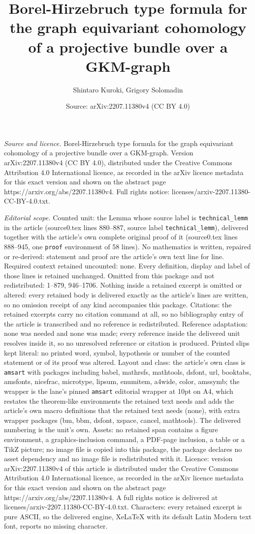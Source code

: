 \documentclass[10pt,a4paper]{amsart}
\title[Borel-Hirzebruch type formula for the graph equivariant coho]{Borel-Hirzebruch type formula for the graph equivariant cohomology of a projective bundle over a GKM-graph}
\author{Shintaro Kuroki, Grigory Solomadin}
\date{Source: arXiv:2207.11380v4 (CC BY 4.0)}
\begin{document}
\maketitle

\noindent\emph{Source and licence.} Borel-Hirzebruch type formula for the graph equivariant cohomology of a projective bundle over a GKM-graph. Version arXiv:2207.11380v4 (CC BY 4.0), distributed under the Creative Commons Attribution 4.0 International licence, as recorded in the arXiv licence metadata for this exact version and shown on the abstract page https://arxiv.org/abs/2207.11380v4. Full rights notice: licenses/arxiv-2207.11380-CC-BY-4.0.txt.\par\smallskip

\noindent\textit{Editorial scope.} Counted unit: the Lemma whose source label is \texttt{technical\_lemm} in the article (source0.tex lines 880--887, source label \texttt{technical\_lemm}), delivered together with the article's own complete original proof of it (source0.tex lines 888--945, one \texttt{proof} environment of 58 lines). No mathematics is written, repaired or re-derived: statement and proof are the article's own text line for line. Required context retained uncounted: none. Every definition, display and label of those lines is retained unchanged. Omitted from this package and not redistributed: 1--879, 946--1706. Nothing inside a retained excerpt is omitted or altered: every retained body is delivered exactly as the article's lines are written, so no omission receipt of any kind accompanies this package. Citations: the retained excerpts carry no citation command at all, so no bibliography entry of the article is transcribed and no reference is redistributed. Reference adaptation: none was needed and none was made; every reference inside the delivered unit resolves inside it, so no unresolved reference or citation is produced. Printed slips kept literal: no printed word, symbol, hypothesis or number of the counted statement or of its proof was altered. Layout and class: the article's own class is \texttt{amsart} with packages including babel, mathrsfs, mathtools, dsfont, url, booktabs, amsfonts, nicefrac, microtype, lipsum, enumitem, a4wide, color, amssymb; the wrapper is the lane's pinned \texttt{amsart} editorial wrapper at 10pt on A4, which restates the theorem-like environments the retained text needs and adds the article's own macro definitions that the retained text needs (none), with extra wrapper packages (bm, bbm, dsfont, xspace, cancel, mathtools). The delivered numbering is the unit's own. Assets: no retained span contains a figure environment, a graphics-inclusion command, a PDF-page inclusion, a table or a TikZ picture; no image file is copied into this package, the package declares no asset dependency and no image file is redistributed with it. Licence: version arXiv:2207.11380v4 of this article is distributed under the Creative Commons Attribution 4.0 International licence, as recorded in the arXiv licence metadata for this exact version and shown on the abstract page https://arxiv.org/abs/2207.11380v4. A full rights notice is delivered at licenses/arxiv-2207.11380-CC-BY-4.0.txt. Characters: every retained excerpt is pure ASCII, so the delivered engine, XeLaTeX with its default Latin Modern text font, reports no missing character.
\end{document}
